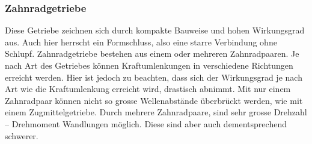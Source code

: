 \subsubsection{Zahnradgetriebe}
Diese Getriebe zeichnen sich durch kompakte Bauweise und hohen Wirkungsgrad aus. Auch hier herrscht ein Formschluss, also eine starre Verbindung ohne Schlupf. Zahnradgetriebe bestehen aus einem oder mehreren Zahnradpaaren. Je nach Art des Getriebes können Kraftumlenkungen in verschiedene Richtungen erreicht werden. Hier ist jedoch zu beachten, dass sich der Wirkungsgrad je nach Art wie die Kraftumlenkung erreicht wird, drastisch abnimmt. Mit nur einem Zahnradpaar können nicht so grosse Wellenabstände überbrückt werden, wie mit einem Zugmittelgetriebe. Durch mehrere Zahnradpaare, sind sehr grosse Drehzahl – Drehmoment Wandlungen möglich. Diese sind aber auch dementsprechend schwerer. 


 
